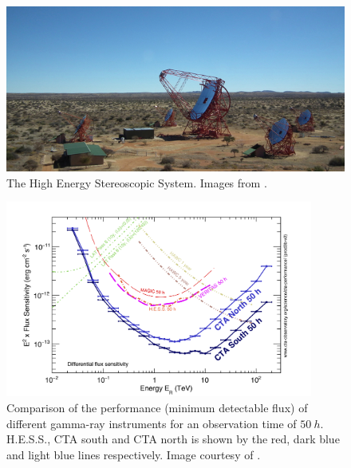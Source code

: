 \begin{figure}[h]
    \centering
    \includegraphics[width=\textwidth]{05_Astronomy/Images/telescopes/HESS_image.jpg}
    \caption{The High Energy Stereoscopic System. Images from \citep{HESS}.}
    \label{fig:chapter_2_HESS}
\end{figure}
\begin{figure}[h]
    \centering
    \includegraphics[width=0.9\textwidth]{05_Astronomy/Images/telescopes/sensitivity_comparison.png}
    \caption{Comparison of the performance (minimum detectable flux) of different gamma-ray instruments for an observation time of $50~\si{h}$. H.E.S.S., CTA south and CTA north is shown by the red, dark blue and light blue lines respectively. Image courtesy of \citep{2019scta.book.....C}.}
    \label{fig:chapter_2_sensitivity comparison}
\end{figure}

